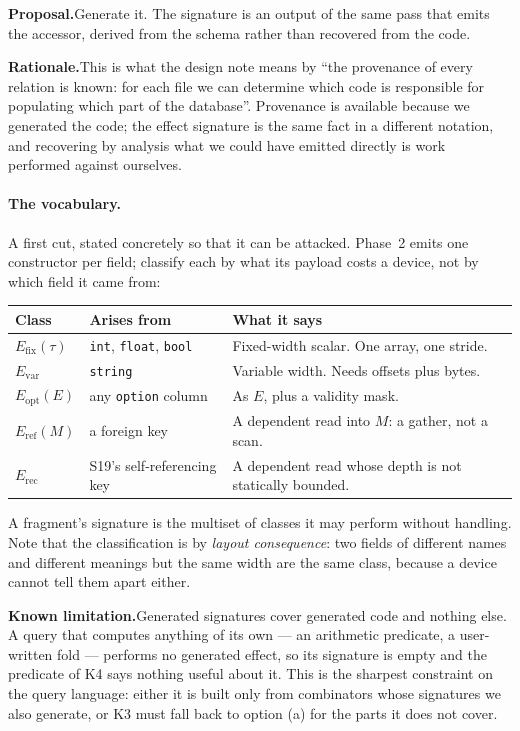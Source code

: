 \documentclass[11pt,a4paper]{article}
\newcommand{\rationale}[1]{%
  \par\noindent\textbf{Rationale.}\quad #1\par\medskip}
\newcommand{\limitation}[1]{%
  \par\noindent\textbf{Known limitation.}\quad #1\par\medskip}
\newcommand{\proposal}[1]{%
  \par\medskip\noindent\textcolor{open}{\textbf{Proposal.}}\quad #1\par\medskip}
\begin{document}
\proposal{Generate it. The signature is an output of the same pass that emits
the accessor, derived from the schema rather than recovered from the code.}

\rationale{This is what the design note means by ``the provenance of every
relation is known: for each file we can determine which code is responsible for
populating which part of the database''. Provenance is available because we
generated the code; the effect signature is the same fact in a different
notation, and recovering by analysis what we could have emitted directly is
work performed against ourselves.}

\paragraph{The vocabulary.} A first cut, stated concretely so that it can be
attacked. Phase~2 emits one constructor per field; classify each by what its
payload costs a device, not by which field it came from:

\begin{center}
\begin{tabular}{@{}llp{6.2cm}@{}}
\hline
\textbf{Class} & \textbf{Arises from} & \textbf{What it says} \\
\hline
$E_{\mathrm{fix}}(\tau)$ & \texttt{int}, \texttt{float}, \texttt{bool}
  & Fixed-width scalar. One array, one stride. \\
$E_{\mathrm{var}}$ & \texttt{string}
  & Variable width. Needs offsets plus bytes. \\
$E_{\mathrm{opt}}(E)$ & any \texttt{option} column
  & As $E$, plus a validity mask. \\
$E_{\mathrm{ref}}(M)$ & a foreign key
  & A dependent read into $M$: a gather, not a scan. \\
$E_{\mathrm{rec}}$ & S19's self-referencing key
  & A dependent read whose depth is not statically bounded. \\
\hline
\end{tabular}
\end{center}

\noindent
A fragment's signature is the multiset of classes it may perform without
handling. Note that the classification is by \emph{layout consequence}: two
fields of different names and different meanings but the same width are the
same class, because a device cannot tell them apart either.

\limitation{Generated signatures cover generated code and nothing else. A
query that computes anything of its own --- an arithmetic predicate, a
user-written fold --- performs no generated effect, so its signature is empty
and the predicate of K4 says nothing useful about it. This is the sharpest
constraint on the query language: either it is built only from combinators
whose signatures we also generate, or K3 must fall back to option (a) for the
parts it does not cover.}
\end{document}
